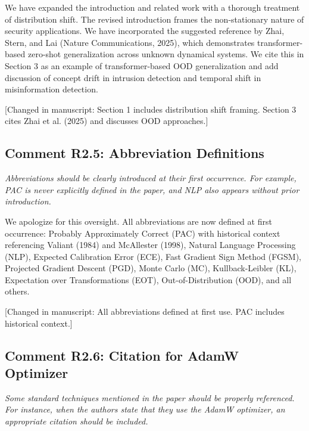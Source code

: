 \documentclass[12pt,a4paper]{article}
\newcommand{\reviewertext}[1]{\textcolor{reviewercolor}{\textit{#1}}}
\newcommand{\response}[1]{\textcolor{responsecolor}{#1}}
\newcommand{\changed}[1]{\textcolor{changecolor}{[Changed in manuscript: #1]}}
\begin{document}
\bigskip

\response{We have expanded the introduction and related work with a thorough treatment of distribution shift. The revised introduction frames the non-stationary nature of security applications. We have incorporated the suggested reference by Zhai, Stern, and Lai (Nature Communications, 2025), which demonstrates transformer-based zero-shot generalization across unknown dynamical systems. We cite this in Section 3 as an example of transformer-based OOD generalization and add discussion of concept drift in intrusion detection and temporal shift in misinformation detection.}

\changed{Section 1 includes distribution shift framing. Section 3 cites Zhai et al. (2025) and discusses OOD approaches.}

\bigskip

\subsection*{Comment R2.5: Abbreviation Definitions}

\reviewertext{Abbreviations should be clearly introduced at their first occurrence. For example, PAC is never explicitly defined in the paper, and NLP also appears without prior introduction.}

\bigskip

\response{We apologize for this oversight. All abbreviations are now defined at first occurrence: Probably Approximately Correct (PAC) with historical context referencing Valiant (1984) and McAllester (1998), Natural Language Processing (NLP), Expected Calibration Error (ECE), Fast Gradient Sign Method (FGSM), Projected Gradient Descent (PGD), Monte Carlo (MC), Kullback-Leibler (KL), Expectation over Transformations (EOT), Out-of-Distribution (OOD), and all others.}

\changed{All abbreviations defined at first use. PAC includes historical context.}

\bigskip

\subsection*{Comment R2.6: Citation for AdamW Optimizer}

\reviewertext{Some standard techniques mentioned in the paper should be properly referenced. For instance, when the authors state that they use the AdamW optimizer, an appropriate citation should be included.}
\end{document}
